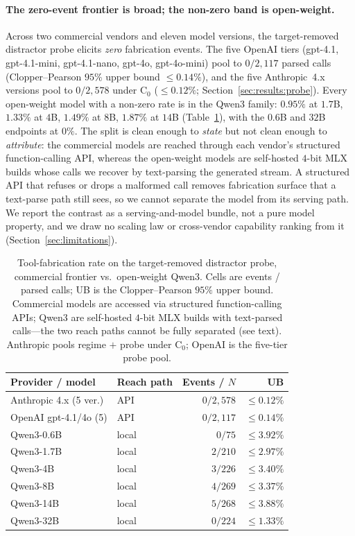 \paragraph{The zero-event frontier is broad; the non-zero band is open-weight.}
Across two commercial vendors and eleven model versions, the
target-removed distractor probe elicits \emph{zero} fabrication events.
The five OpenAI tiers (gpt-4.1, gpt-4.1-mini, gpt-4.1-nano, gpt-4o,
gpt-4o-mini) pool to $0/2{,}117$ parsed calls (Clopper--Pearson $95\%$
upper bound $\leq\!0.14\%$), and the five Anthropic~4.x versions pool to
$0/2{,}578$ under $\mathrm{C}_0$ ($\leq\!0.12\%$;
Section~\ref{sec:results:probe}). Every open-weight model with a non-zero
rate is in the Qwen3 family: $0.95\%$ at $1.7$B, $1.33\%$ at $4$B,
$1.49\%$ at $8$B, $1.87\%$ at $14$B (Table~\ref{tab:frontier}), with the
$0.6$B and $32$B endpoints at $0\%$. The split is clean enough to
\emph{state} but not clean enough to \emph{attribute}: the commercial
models are reached through each vendor's structured function-calling API,
whereas the open-weight models are self-hosted $4$-bit MLX builds whose
calls we recover by text-parsing the generated stream. A structured API
that refuses or drops a malformed call removes fabrication surface that a
text-parse path still sees, so we cannot separate the model from its
serving path. We report the contrast as a serving-and-model bundle, not a
pure model property, and we draw no scaling law or cross-vendor capability
ranking from it (Section~\ref{sec:limitations}).

\begin{table}[t]
\caption{Tool-fabrication rate on the target-removed distractor probe,
commercial frontier vs.\ open-weight Qwen3. Cells are events / parsed
calls; UB is the Clopper--Pearson $95\%$ upper bound. Commercial models
are accessed via structured function-calling APIs; Qwen3 are self-hosted
$4$-bit MLX builds with text-parsed calls---the two reach paths cannot be
fully separated (see text). Anthropic pools regime $+$ probe under
$\mathrm{C}_0$; OpenAI is the five-tier probe pool.}
\label{tab:frontier}
\centering
\small
\setlength{\tabcolsep}{6pt}
\begin{tabular}{llrr}
\toprule
Provider / model & Reach path & Events / $N$ & UB \\
\midrule
Anthropic 4.x (5 ver.)   & API   & $0/2{,}578$ & $\leq0.12\%$ \\
OpenAI gpt-4.1/4o (5)     & API   & $0/2{,}117$ & $\leq0.14\%$ \\
\midrule
Qwen3-0.6B               & local & $0/75$   & $\leq3.92\%$ \\
Qwen3-1.7B               & local & $2/210$  & $\leq2.97\%$ \\
Qwen3-4B                 & local & $3/226$  & $\leq3.40\%$ \\
Qwen3-8B                 & local & $4/269$  & $\leq3.37\%$ \\
Qwen3-14B                & local & $5/268$  & $\leq3.88\%$ \\
Qwen3-32B                & local & $0/224$  & $\leq1.33\%$ \\
\bottomrule
\end{tabular}
\end{table}

